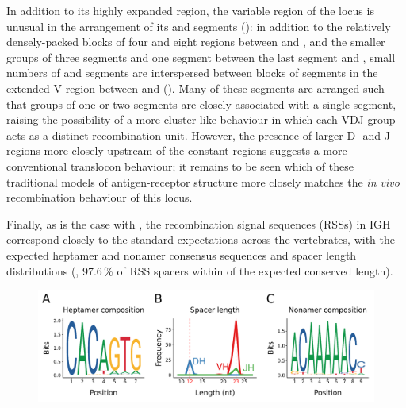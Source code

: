 In addition to its highly expanded \vh region, the variable region of the \Xma locus is unusual in the arrangement of its \dh and \jh segments (): in addition to the relatively densely-packed blocks of four \dh and eight \jh regions between  and , and the smaller groups of three \dh segments and one \jh segment between the last \vh segment and , small numbers of \dh and \jh segments are interspersed between blocks of \vh segments in the extended V-region between  and  (). Many of these segments are arranged such that groups of one or two \dh segments are closely associated with a single \jh segment, raising the possibility of a more cluster-like behaviour in which each VDJ group acts as a distinct recombination unit. However, the presence of larger D- and J-regions more closely upstream of the constant regions suggests a more conventional translocon behaviour; it remains to be seen which of these traditional models of antigen-receptor structure more closely matches the \textit{in vivo} recombination behaviour of this locus.
		
Finally, as is the case with \Nfu, the recombination signal sequences (RSSs) in \Xma IGH correspond closely to the standard expectations across the vertebrates, with the expected heptamer and nonamer consensus sequences and spacer length distributions (, 97.6\,\% of RSS spacers within  of the expected conserved length).	

	\begin{figure}
		\begin{subfigure}{0em}
        \label{fig:xma-rss-seqlogo-all-heptamer}
    \end{subfigure}
    \begin{subfigure}{0em}
        \label{fig:xma-rss-seqlogo-all-spacer}
    \end{subfigure}
    \begin{subfigure}{0em}
        \label{fig:xma-rss-seqlogo-all-nonamer}
    \end{subfigure}
	\includegraphics[width=\textwidth]{_Figures/png/xma-new-rss-seqlogo-all}
	\label{fig:xma-rss-seqlogo-all}
	\vspace{1em}
	\end{figure}
	

